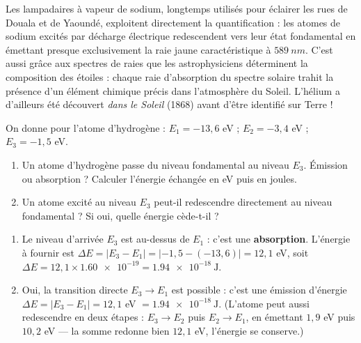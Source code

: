 \documentclass[11pt]{article}
\begin{document}
\begin{savaistu}
Les lampadaires à vapeur de sodium, longtemps utilisés pour éclairer les rues de Douala et de Yaoundé, exploitent directement la quantification : les atomes de sodium excités par décharge électrique redescendent vers leur état fondamental en émettant presque exclusivement la raie jaune caractéristique à $\SI{589}{nm}$. C'est aussi grâce aux spectres de raies que les astrophysiciens déterminent la composition des étoiles : chaque raie d'absorption du spectre solaire trahit la présence d'un élément chimique précis dans l'atmosphère du Soleil. L'hélium a d'ailleurs été découvert \emph{dans le Soleil} (1868) avant d'être identifié sur Terre !
\end{savaistu}

\begin{exercice}
On donne pour l'atome d'hydrogène : $E_1 = -13,6$ eV ; $E_2 = -3,4$ eV ; $E_3 = -1,5$ eV.
\begin{enumerate}
\item Un atome d'hydrogène passe du niveau fondamental au niveau $E_3$. Émission ou absorption ? Calculer l'énergie échangée en eV puis en joules.
\item Un atome excité au niveau $E_3$ peut-il redescendre directement au niveau fondamental ? Si oui, quelle énergie cède-t-il ?
\end{enumerate}
\end{exercice}

\begin{corrige}[Exercice]
\begin{enumerate}
\item Le niveau d'arrivée $E_3$ est au-dessus de $E_1$ : c'est une \textbf{absorption}. L'énergie à fournir est $\Delta E = |E_3 - E_1| = |-1,5 - (-13,6)| = 12,1$ eV, soit $\Delta E = 12,1 \times \num{1,60e-19} = \num{1,94e-18}~\text{J}$.
\item Oui, la transition directe $E_3 \to E_1$ est possible : c'est une émission d'énergie $\Delta E = |E_3 - E_1| = 12,1$ eV $= \num{1,94e-18}~\text{J}$. (L'atome peut aussi redescendre en deux étapes : $E_3 \to E_2$ puis $E_2 \to E_1$, en émettant $1,9$ eV puis $10,2$ eV — la somme redonne bien $12,1$ eV, l'énergie se conserve.)
\end{enumerate}
\end{corrige}
\end{document}
